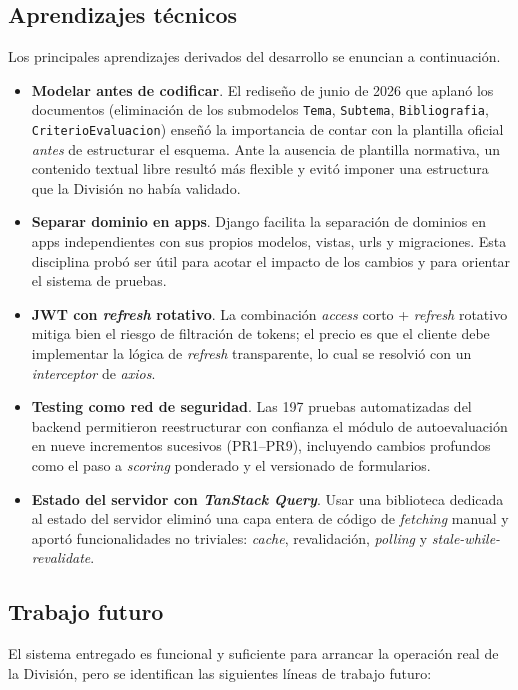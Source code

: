 \subsection{Aprendizajes técnicos}

Los principales aprendizajes derivados del desarrollo se enuncian a continuación.

\begin{itemize}
    \item \textbf{Modelar antes de codificar}. El rediseño de junio de 2026 que aplanó los documentos (eliminación de los submodelos \texttt{Tema}, \texttt{Subtema}, \texttt{Bibliografia}, \texttt{CriterioEvaluacion}) enseñó la importancia de contar con la plantilla oficial \emph{antes} de estructurar el esquema. Ante la ausencia de plantilla normativa, un contenido textual libre resultó más flexible y evitó imponer una estructura que la División no había validado.
    \item \textbf{Separar dominio en apps}. Django facilita la separación de dominios en apps independientes con sus propios modelos, vistas, urls y migraciones. Esta disciplina probó ser útil para acotar el impacto de los cambios y para orientar el sistema de pruebas.
    \item \textbf{JWT con \emph{refresh} rotativo}. La combinación \emph{access} corto + \emph{refresh} rotativo mitiga bien el riesgo de filtración de tokens; el precio es que el cliente debe implementar la lógica de \emph{refresh} transparente, lo cual se resolvió con un \emph{interceptor} de \emph{axios}.
    \item \textbf{Testing como red de seguridad}. Las 197 pruebas automatizadas del backend permitieron reestructurar con confianza el módulo de autoevaluación en nueve incrementos sucesivos (PR1--PR9), incluyendo cambios profundos como el paso a \emph{scoring} ponderado y el versionado de formularios.
    \item \textbf{Estado del servidor con \emph{TanStack Query}}. Usar una biblioteca dedicada al estado del servidor eliminó una capa entera de código de \emph{fetching} manual y aportó funcionalidades no triviales: \emph{cache}, revalidación, \emph{polling} y \emph{stale-while-revalidate}.
\end{itemize}

\subsection{Trabajo futuro}

El sistema entregado es funcional y suficiente para arrancar la operación real de la División, pero se identifican las siguientes líneas de trabajo futuro:

